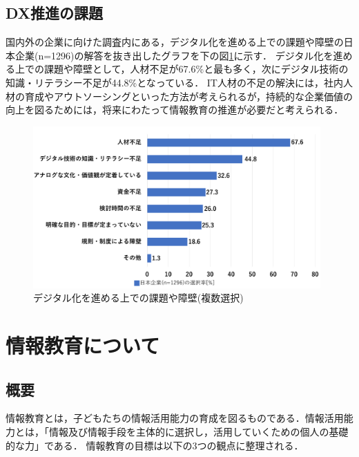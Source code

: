 \documentclass[12pt,a4j,titlepage]{ltjsarticle}
\begin{document}
\subsection{DX推進の課題}
国内外の企業に向けた調査内にある，デジタル化を進める上での課題や障壁の日本企業(n=1296)の解答を抜き出したグラフを下の図\ref{fig:dx}に示す\cite{dx_kadai}．
デジタル化を進める上での課題や障壁として，人材不足が67.6\%と最も多く，次にデジタル技術の知識・リテラシー不足が44.8\%となっている．
IT人材の不足の解決には，社内人材の育成やアウトソーシングといった方法が考えられるが，持続的な企業価値の向上を図るためには，将来にわたって情報教育の推進が必要だと考えられる．
\\
\begin{figure}[h]
\centering
\includegraphics[clip,width=110mm]{figures/dx.pdf}
\caption[デジタル化を進める上での課題や障壁]{デジタル化を進める上での課題や障壁(複数選択)\linebreak}
\label{fig:dx}
\end{figure}

\clearpage

\section{情報教育について}%
\subsection{概要}
情報教育とは，子どもたちの情報活用能力の育成を図るものである．情報活用能力とは，「情報及び情報手段を主体的に選択し，活用していくための個人の基礎的な力」である．
情報教育の目標は以下の3つの観点に整理される\cite{kyoiku_gaiyou}．
\end{document}

